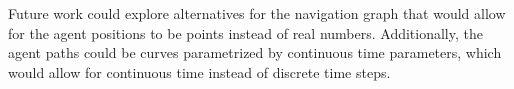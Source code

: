 \documentclass[9pt]{pnas-new}
\begin{document}
Future work could explore alternatives for the navigation graph that would allow for the agent positions to be points instead of real numbers. Additionally, the agent paths could be curves parametrized by continuous time parameters, which would allow for continuous time instead of discrete time steps.

\showacknow %


\begin{multicols}{2}
\section*{\bibname}

\end{multicols}
\end{document}
